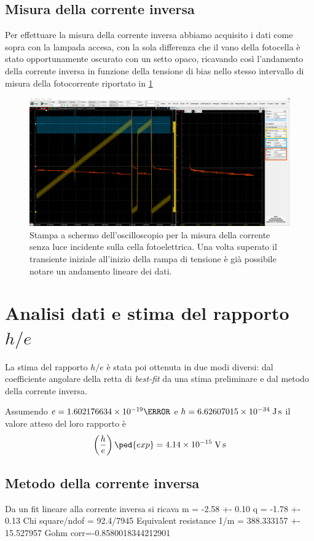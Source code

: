 \documentclass[10pt, a4paper, italian]{article}
\begin{document}
\subsection{Misura della corrente inversa}
Per effettuare la misura della corrente inversa abbiamo acquisito i dati come
sopra con la lampada accesa, con la sola differenza che il vano della
fotocella è stato opportunamente oscurato con un setto opaco, ricavando così
l'andamento della corrente inversa in funzione della tensione di bias nello
stesso intervallo di misura della fotocorrente riportato in \cref{fig: dark}
\begin{figure}[htbp]
    \centering
	\includegraphics[width=\textwidth]{dark}
    \caption{Stampa a schermo dell'oscilloscopio per la misura della corrente
    senza luce incidente sulla cella fotoelettrica. Una volta superato il
    transiente iniziale all'inizio della rampa di tensione è già possibile
    notare un andamento lineare dei dati.
    \label{fig: dark}}
\end{figure}

\section{Analisi dati e stima del rapporto $h/e$}
La stima del rapporto $h/e$ è stata poi ottenuta in due modi diversi: dal coefficiente angolare della retta di \emph{best-fit} da una stima preliminare e dal metodo della corrente inversa.

Assumendo $e = 1.602176634 \times 10^{-19}{\coulomb} $ e $h = \si 6.62607015 \times 10^{-34} \; \si{\J\s} $ il valore atteso del loro rapporto è
\begin{equation}\label{eq: e/h}
\left(\frac{h}{e}\right)\ped{exp} = 4.14 \times 10^{-15} \; \si{\V\s}
\end{equation}

\subsection{Metodo della corrente inversa}
Da un fit lineare alla corrente inversa si ricava
m = -2.58 +- 0.10
q = -1.78 +- 0.13
Chi square/ndof = 92.4/7945
Equivalent resistance 1/m = 388.333157 +- 15.527957 Gohm
corr=-0.8580018344212901
\end{document}
